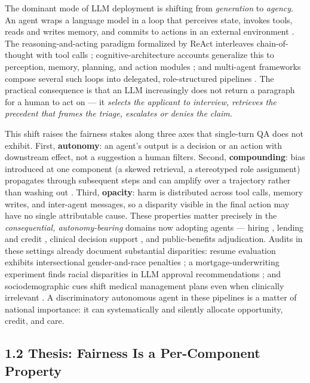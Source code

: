 \documentclass[sigconf,nonacm]{acmart}
\begin{document}
The dominant mode of LLM deployment is shifting from \emph{generation} to \emph{agency}. An agent wraps a language model in a loop that perceives state, invokes tools, reads and writes memory, and commits to actions in an external environment \cite{wang2024survey, xi2023rise}. The reasoning-and-acting paradigm formalized by ReAct interleaves chain-of-thought with tool calls \cite{yao2023react}; cognitive-architecture accounts generalize this to perception, memory, planning, and action modules \cite{sumers2024cognitive}; and multi-agent frameworks compose several such loops into delegated, role-structured pipelines \cite{wu2023autogen, park2023generative}. The practical consequence is that an LLM increasingly does not return a paragraph for a human to act on — it \emph{selects the applicant to interview, retrieves the precedent that frames the triage, escalates or denies the claim.}

This shift raises the fairness stakes along three axes that single-turn QA does not exhibit. First, \textbf{autonomy}: an agent's output is a decision or an action with downstream effect, not a suggestion a human filters. Second, \textbf{compounding}: bias introduced at one component (a skewed retrieval, a stereotyped role assignment) propagates through subsequent steps and can amplify over a trajectory rather than washing out \cite{ma2026implicit, nguyen2025social}. Third, \textbf{opacity}: harm is distributed across tool calls, memory writes, and inter-agent messages, so a disparity visible in the final action may have no single attributable cause. These properties matter precisely in the \emph{consequential, autonomy-bearing} domains now adopting agents — hiring \cite{an2025measuring, veldanda2023emily, nghiem2024you}, lending and credit \cite{bowen2024measuring, feng2023empowering, azime2025accept}, clinical decision support \cite{omar2025sociodemographic, zack2024coding, poulain2024bias}, and public-benefits adjudication. Audits in these settings already document substantial disparities: resume evaluation exhibits intersectional gender-and-race penalties \cite{an2025measuring}; a mortgage-underwriting experiment finds racial disparities in LLM approval recommendations \cite{bowen2024measuring}; and sociodemographic cues shift medical management plans even when clinically irrelevant \cite{omar2025sociodemographic}. A discriminatory autonomous agent in these pipelines is a matter of national importance: it can systematically and silently allocate opportunity, credit, and care.

\subsection{1.2 Thesis: Fairness Is a Per-Component Property}
\end{document}
